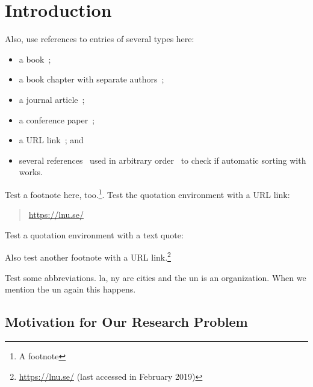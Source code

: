 \chapter{Introduction}\label{ch:introduction}


\noindent \kant[7-8]

Also, use references to entries of several types here: 
\begin{itemize}
\item a book~\cite{Card1999};
\item a book chapter with separate authors~\cite{Fekete2008};
\item a journal article~\cite{VanWijk2006a};
\item a conference paper~\cite{Shneiderman1996};
\item a URL link~\cite{ColorBrewer}; and
\item several references~\cite{Shneiderman1996,Card1999,VanWijk2006a,Fekete2008,ColorBrewer} used in arbitrary order~\cite{VanWijk2006a,ColorBrewer} to check if automatic sorting with  works.
\end{itemize}

\noindent Test a footnote here, too.\footnote{A footnote}. 
Test the quotation environment with a URL link:
\begin{quotation}
\centering
\url{https://lnu.se/}
\end{quotation}

\noindent Test a quotation environment with a text quote:
\begin{quote}
\emph{}
\end{quote} 
\noindent Also test another footnote with a URL link.\footnote{\url{https://lnu.se/} (last accessed in February 2019)}

\noindent Test some abbreviations. \ac{la}, \ac{ny} are cities and the \ac{un} is an organization. When we mention the \ac{un} again this happens.


\section[Motivation for Our Problem]{Motivation for Our Research Problem%
%
}\label{sec:intro-motivation}

